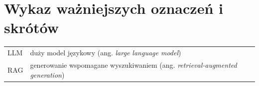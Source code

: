 \chapter*{Wykaz ważniejszych oznaczeń i skrótów}

\begin{tabular}{l l}
LLM & duży model językowy (ang. \emph{large language model})\\
RAG & generowanie wspomagane wyszukiwaniem (ang. \emph{retrieval-augmented generation})\\
\end{tabular}

